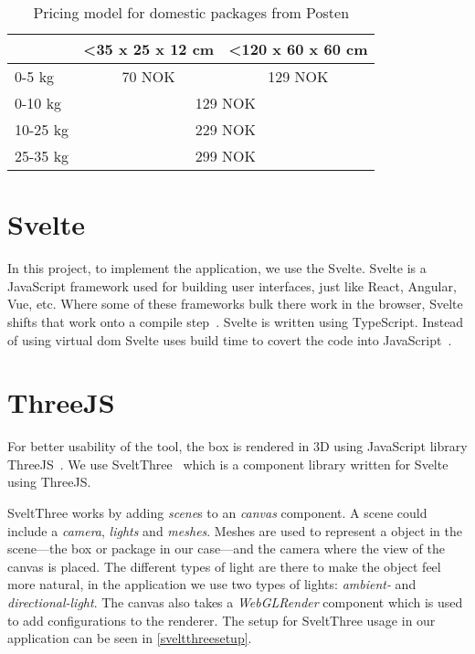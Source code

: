 \begin{table}[h]
    \centering
    \caption{Pricing model for domestic packages from Posten}
    \label{pricingmodel}
    \begin{tabular}{|l|cl|}
    \hline
             & \multicolumn{1}{l|}{\textless 35 x 25 x 12 cm} & \textless 120 x 60 x 60 cm    \\ \hline
    0-5 kg   & \multicolumn{1}{c|}{70 NOK}                     & \multicolumn{1}{c|}{129 NOK} \\ \hline
    0-10 kg  & \multicolumn{2}{c|}{129 NOK}                                                   \\ \hline
    10-25 kg & \multicolumn{2}{c|}{229 NOK}                                                   \\ \hline
    25-35 kg & \multicolumn{2}{c|}{299 NOK}                                                   \\ \hline
    \end{tabular}
\end{table}


\section{Svelte}
In this project, to implement the application, we use the Svelte. Svelte is a JavaScript framework used for building user interfaces, just like React, Angular, Vue, etc. Where some of these frameworks bulk there work in the browser, Svelte shifts that work onto a compile step~\cite{sveltewebsite}. Svelte is written using TypeScript. Instead of using virtual \gls{dom} Svelte uses build time to covert the code into JavaScript~\cite{sveltedocs}. 

\section{ThreeJS}
For better usability of the tool, the box is rendered in 3D using JavaScript library ThreeJS~\cite{threejs}. We use SveltThree~\cite{sveltthree} which is a component library written for Svelte using ThreeJS. 

SveltThree works by adding \textit{scene}s to an \textit{canvas} component. A scene could include a \textit{camera}, \textit{lights} and \textit{meshes}. Meshes are used to represent a object in the scene---the box or package in our case---and the camera where the view of the canvas is placed. The different types of light are there to make the object feel more natural, in the application we use two types of lights: \textit{ambient-} and \textit{directional-light}. The canvas also takes a \textit{WebGLRender} component which is used to add configurations to the renderer. The setup for SveltThree usage in our application can be seen in \autoref{sveltthreesetup}.


